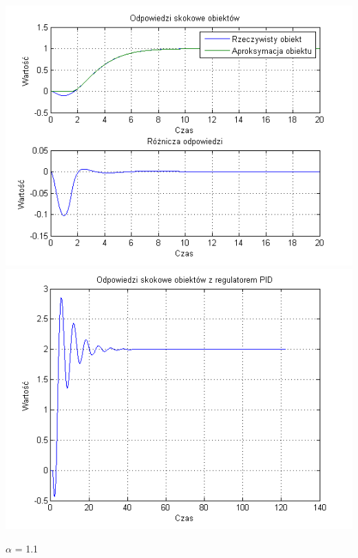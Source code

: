 \documentclass[10pt,a4paper]{article}
\begin{document}
\begin{center}
\includegraphics[scale=1]{images/dwa/skrypt_243.png}\\
\includegraphics[scale=1]{images/dwa/skrypt_244.png}\\
\end{center}
\newpage
$\alpha$ = 1.1
\end{document}
